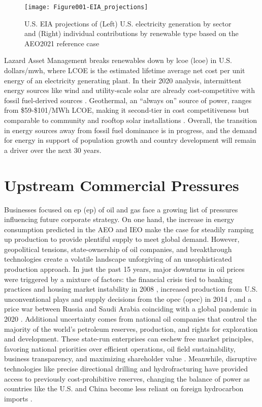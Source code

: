 \begin{figure}[htp]
\centering
\texttt{[image: Figure001-EIA\_projections]}
\caption[U.S. EIA projections based on the AEO2021 reference case]{U.S. EIA projections of (Left) U.S. electricity generation by sector and (Right) individual contributions by renewable type based on the AEO2021 reference case \protect\citep{us_energy_information_administration_annual_2021}}
\label{fig:eia_2021_projections}
\end{figure}

Lazard Asset Management breaks renewables down by \acrlong{lcoe} (\acrshort{lcoe}) in U.S. dollars/\acrshort{mwh}, where LCOE is the estimated lifetime average net cost per unit energy of an electricity generating plant. In their 2020 analysis, intermittent energy sources like wind and utility-scale solar are already cost-competitive with fossil fuel-derived sources \citep{lazard_lazards_2020}. Geothermal, an “always on” source of power, ranges from \$59-\$101/MWh LCOE, making it second-tier in cost competitiveness but comparable to community and rooftop solar installations \citep{lazard_lazards_2020}. Overall, the transition in energy sources away from fossil fuel dominance is in progress, and the demand for energy in support of population growth and country development will remain a driver over the next 30 years.

\section{Upstream Commercial Pressures}\label{ch1:upstream}
Businesses focused on \acrlong{ep} (\acrshort{ep}) of oil and gas face a growing list of pressures influencing future corporate strategy. On one hand, the increase in energy consumption predicted in the AEO and IEO make the case for steadily ramping up production to provide plentiful supply to meet global demand. However, geopolitical tensions, state-ownership of oil companies, and breakthrough technologies create a volatile landscape unforgiving of an unsophisticated production approach. In just the past 15 years, major downturns in oil prices were triggered by a mixture of factors: the financial crisis tied to banking practices and housing market instability in 2008 \citep{singh_2007-2008_2021}, increased production from U.S. unconventional plays and supply decisions from the \acrlong{opec} (\acrshort{opec}) in 2014 \citep{lioudis_what_2021}, and a price war between Russia and Saudi Arabia coinciding with a global pandemic in 2020 \citep{blessing_what_2021}. Additional uncertainty comes from national oil companies that control the majority of the world’s petroleum reserves, production, and rights for exploration and development. These state-run enterprises can eschew free market principles, favoring national priorities over efficient operations, oil field sustainability, business transparency, and maximizing shareholder value \citep{pirog_role_2007}. Meanwhile, disruptive technologies like precise directional drilling and hydrofracturing have provided access to previously cost-prohibitive reserves, changing the balance of power as countries like the U.S. and China become less reliant on foreign hydrocarbon imports \citep{shuen_dynamic_2014}.

